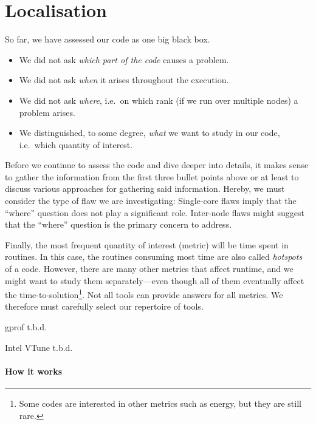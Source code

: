 \section{Localisation}
\label{section:high-level:localisation}

So far, we have assessed our code as one big black box.

\begin{itemize}
  \item We did not ask \emph{which part of the code} causes a problem. 
  \item We did not ask \emph{when} it arises throughout the execution.
  \item We did not ask \emph{where}, i.e.~on which rank (if we run over multiple
  nodes) a problem arises.
  \item We distinguished, to some degree, \emph{what} we want to study in our
  code, i.e.~which quantity of interest.
\end{itemize}

\noindent
Before we continue to assess the code and dive deeper into details, it makes sense to gather the information from the first three bullet points above or at least to discuss various approaches for gathering said information.
Hereby, we must consider the type of flaw we are investigating:
Single-core flaws imply that the ``where'' question does not play a significant
role.
Inter-node flaws might suggest that the ``where'' question is the primary
concern to address.

Finally, the most frequent quantity of interest (metric) will be time spent in routines.
In this case, the routines consuming most time are also called \emph{hotspots} of a code.
However, there are many other metrics that affect runtime, and we might want to study them separately—even though all of them eventually affect the time-to-solution\footnote{Some codes are interested in other metrics such as energy, but they are still rare.}.
Not all tools can provide answers for all metrics.
We therefore must carefully select our repertoire of tools.

\begin{instructions}{gprof}
t.b.d.
\end{instructions}


\begin{instructions}{Intel VTune}
t.b.d.
\end{instructions}

\paragraph*{How it works}


